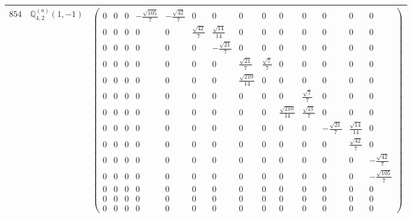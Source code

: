 \documentclass[fleqn,8pt,landscape]{jsarticle}
\begin{document}
\begin{center}
\begin{longtable}{ccc}
$ 854 $ & $ \mathbb{Q}_{4,2}^{(a)}(1,-1) $ & $ \begin{pmatrix} 0 & 0 & 0 & - \frac{\sqrt{105}}{7} & - \frac{\sqrt{42}}{7} & 0 & 0 & 0 & 0 & 0 & 0 & 0 & 0 & 0 \\ 0 & 0 & 0 & 0 & 0 & \frac{\sqrt{42}}{7} & \frac{\sqrt{14}}{14} & 0 & 0 & 0 & 0 & 0 & 0 & 0 \\ 0 & 0 & 0 & 0 & 0 & 0 & - \frac{\sqrt{21}}{7} & 0 & 0 & 0 & 0 & 0 & 0 & 0 \\ 0 & 0 & 0 & 0 & 0 & 0 & 0 & \frac{\sqrt{21}}{7} & \frac{\sqrt{7}}{7} & 0 & 0 & 0 & 0 & 0 \\ 0 & 0 & 0 & 0 & 0 & 0 & 0 & \frac{\sqrt{210}}{14} & 0 & 0 & 0 & 0 & 0 & 0 \\ 0 & 0 & 0 & 0 & 0 & 0 & 0 & 0 & 0 & 0 & \frac{\sqrt{7}}{7} & 0 & 0 & 0 \\ 0 & 0 & 0 & 0 & 0 & 0 & 0 & 0 & 0 & \frac{\sqrt{210}}{14} & \frac{\sqrt{21}}{7} & 0 & 0 & 0 \\ 0 & 0 & 0 & 0 & 0 & 0 & 0 & 0 & 0 & 0 & 0 & - \frac{\sqrt{21}}{7} & \frac{\sqrt{14}}{14} & 0 \\ 0 & 0 & 0 & 0 & 0 & 0 & 0 & 0 & 0 & 0 & 0 & 0 & \frac{\sqrt{42}}{7} & 0 \\ 0 & 0 & 0 & 0 & 0 & 0 & 0 & 0 & 0 & 0 & 0 & 0 & 0 & - \frac{\sqrt{42}}{7} \\ 0 & 0 & 0 & 0 & 0 & 0 & 0 & 0 & 0 & 0 & 0 & 0 & 0 & - \frac{\sqrt{105}}{7} \\ 0 & 0 & 0 & 0 & 0 & 0 & 0 & 0 & 0 & 0 & 0 & 0 & 0 & 0 \\ 0 & 0 & 0 & 0 & 0 & 0 & 0 & 0 & 0 & 0 & 0 & 0 & 0 & 0 \\ 0 & 0 & 0 & 0 & 0 & 0 & 0 & 0 & 0 & 0 & 0 & 0 & 0 & 0 \end{pmatrix} $ \\ \hline

\end{longtable}
\end{center}
\end{document}
